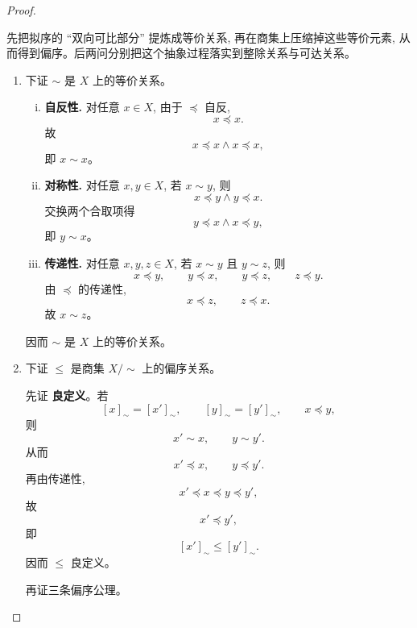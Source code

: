 \documentclass[a4paper, justified]{tufte-handout}
\begin{document}
\begin{proof}
  \begin{intention}
    先把拟序的 ``双向可比部分'' 提炼成等价关系, 再在商集上压缩掉这些等价元素, 从而得到偏序。后两问分别把这个抽象过程落实到整除关系与可达关系。
  \end{intention}

  \begin{enumerate}[(1)]
    \item 下证 $\sim$ 是 $X$ 上的等价关系。

      \begin{enumerate}[(i)]
        \item \textbf{自反性.} 对任意 $x \in X$, 由于 $\preceq$ 自反,
          \[
            x \preceq x.
          \]
          故
          \[
            x \preceq x \land x \preceq x,
          \]
          即 $x \sim x$。

        \item \textbf{对称性.} 对任意 $x, y \in X$, 若 $x \sim y$, 则
          \[
            x \preceq y \land y \preceq x.
          \]
          交换两个合取项得
          \[
            y \preceq x \land x \preceq y,
          \]
          即 $y \sim x$。

        \item \textbf{传递性.} 对任意 $x, y, z \in X$, 若 $x \sim y$ 且 $y \sim z$, 则
          \[
            x \preceq y, \qquad y \preceq x,
            \qquad y \preceq z, \qquad z \preceq y.
          \]
          由 $\preceq$ 的传递性,
          \[
            x \preceq z,
            \qquad
            z \preceq x.
          \]
          故 $x \sim z$。
      \end{enumerate}

      因而 $\sim$ 是 $X$ 上的等价关系。

    \item 下证 $\le$ 是商集 $X/\sim$ 上的偏序关系。

      先证 \textbf{良定义}。若
      \[
        [x]_{\sim} = [x']_{\sim},
        \qquad
        [y]_{\sim} = [y']_{\sim},
        \qquad
        x \preceq y,
      \]
      则
      \[
        x' \sim x,
        \qquad
        y \sim y'.
      \]
      从而
      \[
        x' \preceq x,
        \qquad
        y \preceq y'.
      \]
      再由传递性,
      \[
        x' \preceq x \preceq y \preceq y',
      \]
      故
      \[
        x' \preceq y',
      \]
      即
      \[
        [x']_{\sim} \le [y']_{\sim}.
      \]
      因而 $\le$ 良定义。

      再证三条偏序公理。


\end{enumerate}
\end{proof}
\end{document}
